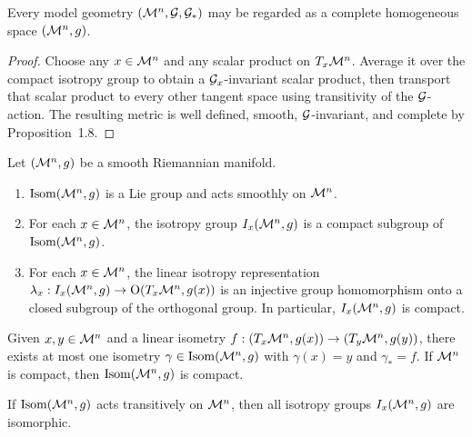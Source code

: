 \begin{lemma}
\label{ch01-lem-model-geometry-to-homogeneous-space}
Every model geometry $(\mathcal{M}^n,\mathcal{G},\mathcal{G}_*)$ may be regarded as a complete homogeneous space $(\mathcal{M}^n,g)$.
\end{lemma}

\begin{proof}
Choose any $x\in \mathcal{M}^n$ and any scalar product on $T_x\mathcal{M}^n$. Average it over the compact isotropy group to obtain a $\mathcal{G}_x$-invariant scalar product, then transport that scalar product to every other tangent space using transitivity of the $\mathcal{G}$-action. The resulting metric is well defined, smooth, $\mathcal{G}$-invariant, and complete by Proposition~1.8.
\end{proof}

\begin{proposition}
\label{ch01-prop-isometry-group}
Let $(\mathcal{M}^n,g)$ be a smooth Riemannian manifold.
\begin{enumerate}
\item $\operatorname{Isom}(\mathcal{M}^n,g)$ is a Lie group and acts smoothly on $\mathcal{M}^n$.
\item For each $x \in \mathcal{M}^n$, the isotropy group $I_x(\mathcal{M}^n,g)$ is a compact subgroup of $\operatorname{Isom}(\mathcal{M}^n,g)$.
\item For each $x \in \mathcal{M}^n$, the linear isotropy representation $\lambda_x : I_x(\mathcal{M}^n,g) \to \operatorname{O}(T_x \mathcal{M}^n, g(x))$ is an injective group homomorphism onto a closed subgroup of the orthogonal group. In particular, $I_x(\mathcal{M}^n,g)$ is compact.
\end{enumerate}
\end{proposition}

\begin{corollary}
\label{ch01-cor-unique-isometry}
Given $x,y \in \mathcal{M}^n$ and a linear isometry $f : (T_x \mathcal{M}^n,g(x)) \to (T_y \mathcal{M}^n,g(y))$, there exists at most one isometry $\gamma \in \operatorname{Isom}(\mathcal{M}^n,g)$ with $\gamma(x)=y$ and $\gamma_* = f$. If $\mathcal{M}^n$ is compact, then $\operatorname{Isom}(\mathcal{M}^n,g)$ is compact.
\end{corollary}

\begin{lemma}
\label{ch01-lem-isotropy-isomorphic}
If $\operatorname{Isom}(\mathcal{M}^n,g)$ acts transitively on $\mathcal{M}^n$, then all isotropy groups $I_x(\mathcal{M}^n,g)$ are isomorphic.
\end{lemma}

